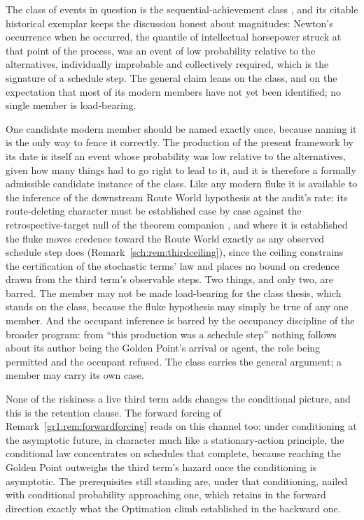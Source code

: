 \begin{remark}
The class of events in question is the sequential-achievement class
\cite{Outliers}, and its citable historical exemplar keeps the
discussion honest about magnitudes: Newton's occurrence when he
occurred, the quantile of intellectual horsepower struck at that
point of the process, was an event of low probability relative to
the alternatives, individually improbable and collectively required,
which is the signature of a schedule step. The general claim leans
on the class, and on the expectation that most of its modern members
have not yet been identified; no single member is load-bearing.

One candidate modern member should be named exactly once, because
naming it is the only way to fence it correctly. The production of
the present framework by its date is itself an event whose
probability was low relative to the alternatives, given how many
things had to go right to lead to it, and it is therefore a formally
admissible candidate instance of the class. Like any modern fluke it
is available to the inference of the downstream Route World hypothesis at
the audit's rate: its route-deleting character must be established
case by case against the retrospective-target null of
the theorem companion \cite{GoldenTargeted}, and where it is established the
fluke moves credence toward the Route World exactly as any observed
schedule step does (Remark~\ref{sch:rem:thirdceiling}), since the
ceiling constrains the certification of the stochastic terms' law and
places no bound on credence drawn from the third term's observable
steps. Two things, and only two, are barred. The member may not be
made load-bearing for the class thesis, which stands on the class,
because the fluke hypothesis may simply be true of any one member.
And the occupant inference is barred by
the occupancy discipline of the broader program: from ``this production was a
schedule step'' nothing follows about its author being the Golden
Point's arrival or agent, the role being permitted and the occupant
refused. The class carries the general argument; a member may carry
its own case.

None of the riskiness a live third term adds changes the conditional
picture, and this is the retention clause. The forward
forcing of Remark~\ref{gr1:rem:forwardforcing} reads on this channel
too: under conditioning at the asymptotic future, in character much
like a stationary-action principle, the conditional law concentrates
on schedules that complete, because reaching the Golden Point
outweighs the third term's hazard once the conditioning is
asymptotic. The prerequisites still standing are, under that
conditioning, nailed with conditional probability approaching one,
which retains in the forward direction exactly what the Optimation
climb established in the backward one.
\end{remark}

